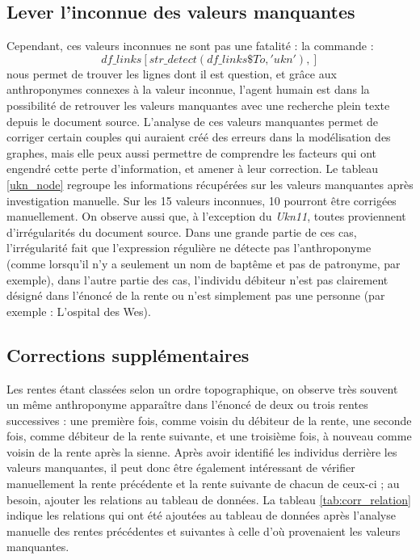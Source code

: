 \subsection{Lever l'inconnue des valeurs manquantes}
Cependant, ces valeurs inconnues ne sont pas une fatalité :  la commande : 
\[ df\_links[str\_detect(df\_links\$To,'ukn'),]\]
nous permet de trouver les lignes dont il est question, et grâce aux anthroponymes connexes à la valeur inconnue, l'agent humain est dans la possibilité de retrouver les valeurs manquantes avec une recherche plein texte depuis le document source. L'analyse de ces valeurs manquantes permet de corriger certain couples qui auraient créé des erreurs dans la modélisation des graphes,  mais elle peux aussi permettre de comprendre les facteurs qui ont engendré cette perte d'information, et amener à leur correction. Le tableau \ref{ukn_node} regroupe les informations récupérées sur les valeurs manquantes après investigation manuelle. Sur les 15 valeurs inconnues, 10 pourront être corrigées manuellement. On observe aussi que, à l'exception du \textit{Ukn11}, toutes proviennent d'irrégularités du document source. Dans une grande partie de ces cas, l'irrégularité fait que l'expression régulière ne détecte pas l'anthroponyme (comme lorsqu'il n'y a seulement un nom de baptême et pas de patronyme, par exemple), dans l'autre partie des cas, l'individu débiteur n'est pas clairement désigné dans l'énoncé de la rente ou  n'est simplement pas une personne (par exemple : L'ospital des Wes).




\subsection{Corrections supplémentaires}

Les rentes étant classées selon un ordre topographique, on observe très souvent un même anthroponyme apparaître dans l'énoncé de deux ou trois rentes successives : une première fois, comme voisin du débiteur de la rente, une seconde fois, comme débiteur de la rente suivante, et une troisième fois, à nouveau comme voisin de la rente après la sienne. Après avoir identifié les individus derrière les valeurs manquantes, il peut donc être également  intéressant de vérifier manuellement la rente précédente  et la rente suivante de chacun de ceux-ci ; au besoin, ajouter les relations  au tableau de données. La tableau \ref{tab:corr_relation} indique les relations qui ont été ajoutées au tableau de données après l'analyse manuelle des rentes précédentes et suivantes à celle d'où provenaient les valeurs manquantes.

 
